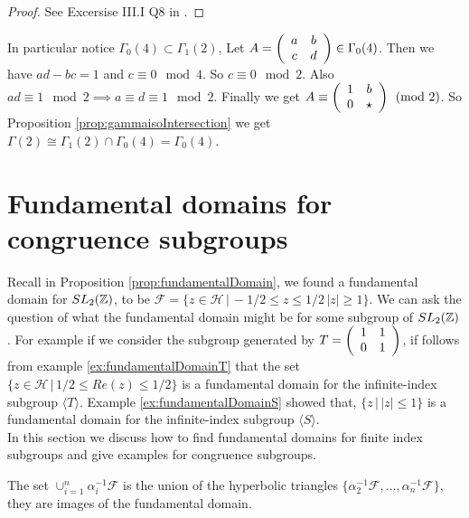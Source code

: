\begin{proof}
See Excersise III.I Q8 in \citep{koblitz}.
\end{proof}

\begin{example}
In particular notice $\Gamma_0(4) \subset \Gamma_1(2)$, 
Let $ A= \left(\begin{array}{ c c } a & b \\ c & d \end{array} \right) \in \Gamma_0(4)$. Then we have $ad-bc =1$ and $c\equiv 0 \mod 4$. So $c \equiv 0 \mod 2$. Also $ad \equiv 1 \mod 2 \implies a \equiv d \equiv 1 \mod 2$. Finally we get $A \equiv \left(\begin{array}{ c c } 1 & b \\ 0 & \star \end{array} \right) \pmod 2$. So Proposition \ref{prop:gammaisoIntersection} we get $\Gamma(2) \cong \Gamma_1(2) \cap \Gamma_0(4) =\Gamma_0(4)$. 
\end{example}




\section{Fundamental domains for congruence subgroups}
Recall in Proposition \ref{prop:fundamentalDomain}, we found a fundamental domain for $SL_2(\mathbb{Z})$, to be $\mathcal{F} = \{z \in \mathcal{H} \, | \, -1/2 \leq z \leq 1/2 \, |z| \geq 1  \}$. We can ask the question of what the fundamental domain might be for some subgroup of $SL_2(\mathbb{Z})$. For example if we consider the subgroup generated by $T = \left(\begin{array}{ c c } 1 & 1 \\ 0 & 1 \end{array} \right)$, if follows from example \ref{ex:fundamentalDomainT} that the set $\{ z \in \mathcal{H} \, \vert \, 1/2 \leq Re(z) \leq 1/2 \}$ is a fundamental domain for the infinite-index subgroup  $\langle T \rangle$. Example \ref{ex:fundamentalDomainS} showed that, $\{ z \, \vert \, \vert z\vert \leq 1 \}$ is a fundamental domain for the infinite-index subgroup $\langle S \rangle$. \\

In this section we discuss how to find fundamental domains for finite index subgroups and give examples for congruence subgroups.\\

\begin{remark} The set $\cup_{i=1}^n\alpha_i^{-1}\mathcal{F}$ is the union of the hyperbolic triangles $\{\alpha_2^{-1}\mathcal{F}, \ldots , \alpha_n^{-1}\mathcal{F}\}$, they are images of the fundamental domain.\\
\end{remark}



